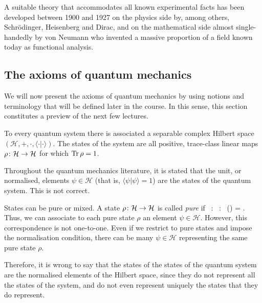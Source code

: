 A suitable theory that accommodates all known experimental facts has been developed between 1900 and 1927 on the physics side by, among others, Schr\"odinger, Heisenberg and Dirac, and on the mathematical side almost single-handedly by von Neumann who invented a massive proportion of a field known today as functional analysis.

\subsection{The axioms of quantum mechanics}

We will now present the axioms of quantum mechanics by using notions and terminology that will be defined later in the course. In this sense, this section constitutes a preview of the next few lectures. 

\begin{tcolorbox}[colframe=blue!10!black,before skip=10pt,after skip=10pt]
\begin{axiom}
To every quantum system there is associated a separable complex Hilbert space $(\mathcal{H},+,\cdot,\langle \cdot | \cdot \rangle)$. The states of the system are all positive, trace-class linear maps $\rho\colon \mathcal{H}\to \mathcal{H}$ for which $\operatorname{Tr}\rho=1$.
\end{axiom}
\end{tcolorbox}

\br
Throughout the quantum mechanics literature, it is stated that the unit, or normalised, elements $\psi\in\mathcal{H}$ (that is, $\langle\psi|\psi\rangle=1$) are the states of the quantum system. This is not correct. 

States can be pure or mixed. A state $\rho\colon \mathcal{H}\to \mathcal{H}$ is called \emph{pure} if
\bse
\exists \, \psi\in {} : \forall \, \alpha\in {} : \ \rho(\alpha) = \frac{\langle\psi|\alpha\rangle}{\langle\psi|\psi\rangle}\psi.
\ese
Thus, we can associate to each pure state $\rho$ an element $\psi\in\mathcal{H}$. However, this correspondence is not one-to-one. Even if we restrict to pure states and impose the normalisation condition, there can be many $\psi\in\mathcal{H}$ representing the same pure state $\rho$. 

Therefore, it is wrong to say that the states of the states of the quantum system are the normalised elements of the Hilbert space, since they do not represent all the states of the system, and do not even represent uniquely the states that they do represent.
\er


